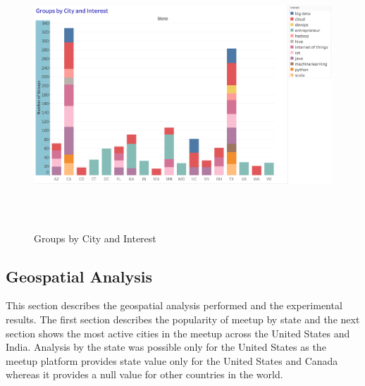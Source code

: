 \documentclass{acm_proc_article-sp}
\begin{document}
\begin{figure}[p]
  \centering
      \includegraphics[width=0.9\linewidth,height=10cm]{images/tableau_images/groups_by_city_and_interest.png}
  \caption{Groups by City and Interest}\label{F:groupbycitynint}
\end{figure}

\subsection{Geospatial Analysis}
This section describes the geospatial analysis performed and the experimental results.  The first section describes the popularity of meetup by state and the next section shows the most active cities in the meetup across the United States and India.  Analysis by the state was possible only for the United States as the meetup platform provides state value only for the United States and Canada whereas it provides a null value for other countries in the world.
\end{document}
